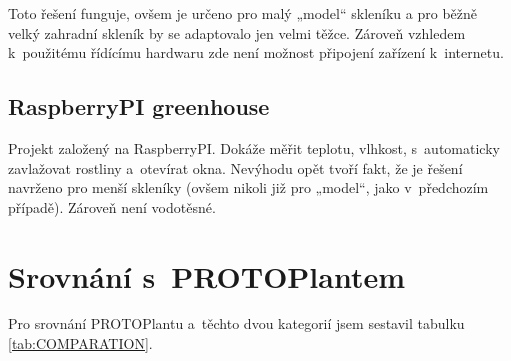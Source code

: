 Toto řešení funguje, ovšem je určeno pro malý „model“ skleníku a pro běžně velký zahradní skleník by se adaptovalo jen velmi těžce.
Zároveň vzhledem k~použitému řídícímu hardwaru zde není možnost připojení zařízení k~internetu.

\subsection{RaspberryPI greenhouse \cite{RPIGREENHOUSE}}
Projekt založený na RaspberryPI. 
Dokáže měřit teplotu, vlhkost, s~automaticky zavlažovat rostliny a~otevírat okna.
Nevýhodu opět tvoří fakt, že je řešení navrženo pro menší skleníky (ovšem nikoli již pro „model“, jako v~předchozím případě).
Zároveň není vodotěsné.

\section{Srovnání s~PROTOPlantem}
Pro srovnání PROTOPlantu a~těchto dvou kategorií jsem sestavil tabulku \ref{tab:COMPARATION}.

